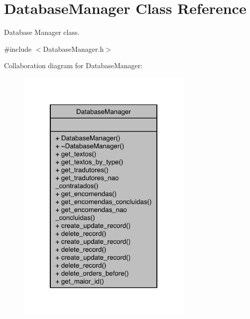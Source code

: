 \hypertarget{class_database_manager}{\section{Database\-Manager Class Reference}
\label{class_database_manager}
}


Database Manager class.  




{\ttfamily \#include $<$Database\-Manager.\-h$>$}



Collaboration diagram for Database\-Manager\-:
\nopagebreak
\begin{figure}[H]
\begin{center}
\leavevmode
\includegraphics[width=240pt]{class_database_manager__coll__graph}
\end{center}
\end{figure}
